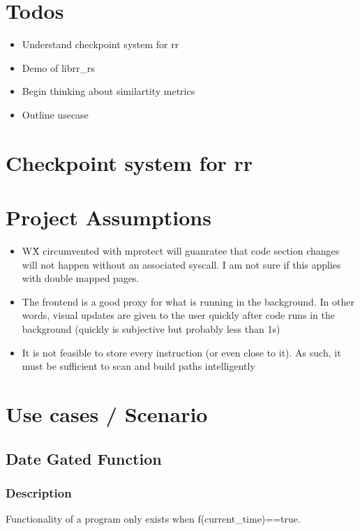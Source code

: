 \maketitle

\section{Todos}
\begin{itemize}
    \item Understand checkpoint system for rr 
    \item Demo of librr\_rs 
    \item Begin thinking about similartity metrics
    \item Outline usecase
\end{itemize}


\section{Checkpoint system for rr}

\section{Project Assumptions}
\begin{itemize}
    \item W\^X circumvented with mprotect will guanratee that code section changes will not happen without an associated syscall. 
        \subitem I am not sure if this applies with double mapped pages. 
    \item The frontend is a good proxy for what is running in the background. In other words, visual updates are given to the user quickly after code runs in the background (quickly is subjective but probably less than 1s) 
    \item It is not feasible to store every instruction (or even close to it). As such, it must be sufficient to scan and build paths intelligently
\end{itemize}
\section{Use cases / Scenario}
\subsection{Date Gated Function}
\subsubsection{Description}
Functionality of a program only exists when f(current\_time)==true. 

